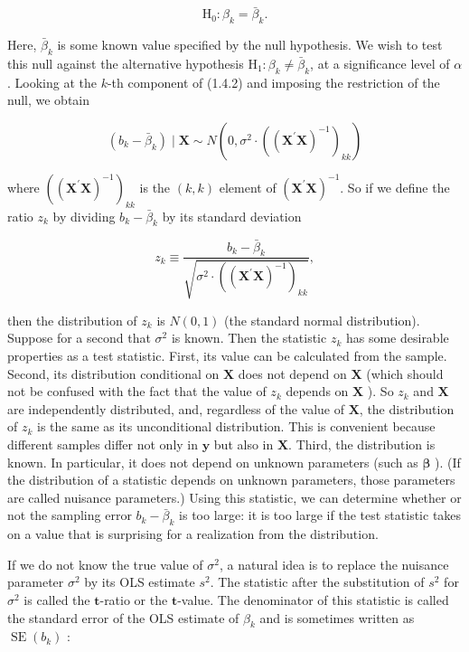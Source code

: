 \documentclass[10pt]{article}
\begin{document}
$$
\mathrm{H}_{0}: \beta_{k}=\bar{\beta}_{k} .
$$

Here, $\bar{\beta}_{k}$ is some known value specified by the null hypothesis. We wish to test this null against the alternative hypothesis $\mathrm{H}_{1}: \beta_{k} \neq \bar{\beta}_{k}$, at a significance level of $\alpha$. Looking at the $k$-th component of (1.4.2) and imposing the restriction of the null, we obtain

$$
\left(b_{k}-\bar{\beta}_{k}\right) \mid \mathbf{X} \sim N\left(0, \sigma^{2} \cdot\left(\left(\mathbf{X}^{\prime} \mathbf{X}\right)^{-1}\right)_{k k}\right)
$$

where $\left(\left(\mathbf{X}^{\prime} \mathbf{X}\right)^{-1}\right)_{k k}$ is the $(k, k)$ element of $\left(\mathbf{X}^{\prime} \mathbf{X}\right)^{-1}$. So if we define the ratio $z_{k}$ by dividing $b_{k}-\bar{\beta}_{k}$ by its standard deviation


\begin{equation*}
z_{k} \equiv \frac{b_{k}-\bar{\beta}_{k}}{\sqrt{\sigma^{2} \cdot\left(\left(\mathbf{X}^{\prime} \mathbf{X}\right)^{-1}\right)_{k k}}}, \tag{1.4.3}
\end{equation*}


then the distribution of $z_{k}$ is $N(0,1)$ (the standard normal distribution).\\
Suppose for a second that $\sigma^{2}$ is known. Then the statistic $z_{k}$ has some desirable properties as a test statistic. First, its value can be calculated from the sample. Second, its distribution conditional on $\mathbf{X}$ does not depend on $\mathbf{X}$ (which should not be confused with the fact that the value of $z_{k}$ depends on $\mathbf{X}$ ). So $z_{k}$ and $\mathbf{X}$ are independently distributed, and, regardless of the value of $\mathbf{X}$, the distribution of $z_{k}$ is the same as its unconditional distribution. This is convenient because different samples differ not only in $\mathbf{y}$ but also in $\mathbf{X}$. Third, the distribution is known. In particular, it does not depend on unknown parameters (such as $\boldsymbol{\beta}$ ). (If the distribution of a statistic depends on unknown parameters, those parameters are called nuisance parameters.) Using this statistic, we can determine whether or not the sampling error $b_{k}-\bar{\beta}_{k}$ is too large: it is too large if the test statistic takes on a value that is surprising for a realization from the distribution.

If we do not know the true value of $\sigma^{2}$, a natural idea is to replace the nuisance parameter $\sigma^{2}$ by its OLS estimate $s^{2}$. The statistic after the substitution of $s^{2}$ for\\
$\sigma^{2}$ is called the $\boldsymbol{t}$-ratio or the $\boldsymbol{t}$-value. The denominator of this statistic is called the standard error of the OLS estimate of $\beta_{k}$ and is sometimes written as $\operatorname{SE}\left(b_{k}\right)$ :
\end{document}

